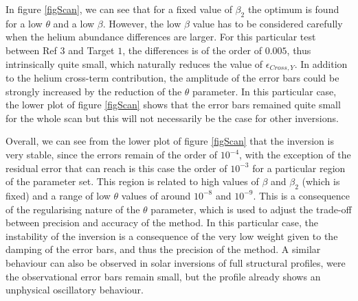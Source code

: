 \documentclass[a4paper,fleqn,usenatbib]{mnras}
\begin{document}
In figure \ref{figScan}, we can see that for a fixed value of $\beta_{2}$ the optimum is found for a low $\theta$ and a low $\beta$. However, the low $\beta$ value has to be considered carefully when the helium abundance differences are larger. For this particular test between Ref $3$ and Target $1$, the differences is of the order of $0.005$, thus intrinsically quite small, which naturally reduces the value of $\epsilon_{Cross, Y}$. In addition to the helium cross-term contribution, the amplitude of the error bars could be strongly increased by the reduction of the $\theta$ parameter. In this particular case, the lower plot of figure \ref{figScan} shows that the error bars remained quite small for the whole scan but this will not necessarily be the case for other inversions.


Overall, we can see from the lower plot of figure \ref{figScan} that the inversion is very stable, since the errors remain of the order of $10^{-4}$, with the exception of the residual error that can reach is this case the order of $10^{-3}$ for a particular region of the parameter set. This region is related to high values of $\beta$ and $\beta_{2}$ (which is fixed) and a range of low $\theta$ values of around $10^{-8}$ and $10^{-9}$.
This is a consequence of the regularising nature of the $\theta$ parameter, which is used to adjust the trade-off between precision and accuracy of the method. In this particular case, the instability of the inversion is a consequence of the very low weight given to the damping of the error bars, and thus the precision of the method. A similar behaviour can also be observed in solar inversions of full structural profiles, were the observational error bars remain small, but the profile already shows an unphysical oscillatory behaviour. 
\end{document}
